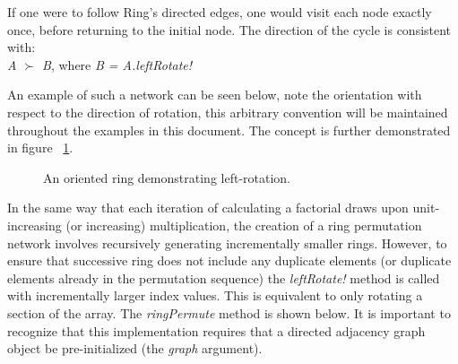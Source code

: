 \documentclass[12pt]{article}
\begin{document}
If one were to follow Ring's directed edges, one would visit each node exactly once, before returning to the initial node.
The direction of the cycle is consistent with:\\
\centering
\emph{A $\succ$ B}, where \emph{B = A.leftRotate!}\\
\raggedright
\setlength{\parindent}{1cm}

An example of such a network can be seen below, note the orientation with respect to the direction of rotation, this arbitrary convention will be maintained throughout the examples in this document.
The concept is further demonstrated in figure ~\ref{8-ring}.\\

\begin{figure}[ht]
\centering
{}
\caption{An oriented ring demonstrating left-rotation.}
\label{8-ring}
\end{figure}
\setlength{\parindent}{1cm}

In the same way that each iteration of calculating a factorial draws upon unit-increasing (or increasing) multiplication, the creation of a ring permutation network involves recursively generating incrementally smaller rings.
However, to ensure that successive ring does not include any duplicate elements (or duplicate elements already in the permutation sequence) the \emph{leftRotate!} method is called with incrementally larger index values.
This is equivalent to only rotating a section of the array.
The \emph{ringPermute} method is shown below.
It is important to recognize that this implementation requires that a directed adjacency graph object be pre-initialized (the \emph{graph} argument).\\
\end{document}
